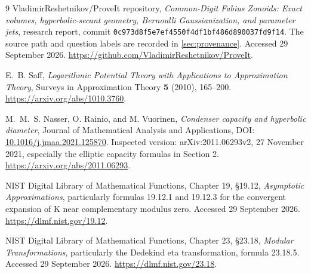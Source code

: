 \documentclass[11pt,a4paper]{article}
\theoremstyle{definition}
\theoremstyle{remark}
\newcommand{\K}{\mathrm K}
\begin{document}
\begin{thebibliography}{9}
VladimirReshetnikov/ProveIt repository,
\emph{Common-Digit Fabius Zonoids: Exact volumes, hyperbolic-secant geometry,
Bernoulli Gaussianization, and parameter jets}, research report,
commit \texttt{0c973d8f5e7ef4550f4df1bf486d890037fd9f14}.
The source path and question labels are recorded in
\cref{sec:provenance}. Accessed 29 September 2026.
\url{https://github.com/VladimirReshetnikov/ProveIt}.

E.~B. Saff,
\emph{Logarithmic Potential Theory with Applications to Approximation Theory},
Surveys in Approximation Theory \textbf{5} (2010), 165--200.
\url{https://arxiv.org/abs/1010.3760}.

M.~M.~S. Nasser, O. Rainio, and M. Vuorinen,
\emph{Condenser capacity and hyperbolic diameter},
Journal of Mathematical Analysis and Applications,
DOI: \href{https://doi.org/10.1016/j.jmaa.2021.125870}{10.1016/j.jmaa.2021.125870}.
Inspected version: arXiv:2011.06293v2, 27 November 2021,
especially the elliptic capacity formulas in Section 2.
\url{https://arxiv.org/abs/2011.06293}.

NIST Digital Library of Mathematical Functions,
Chapter 19, \S19.12, \emph{Asymptotic Approximations},
particularly formulas 19.12.1 and 19.12.3 for the convergent expansion of
$\K$ near complementary modulus zero. Accessed 29 September 2026.
\url{https://dlmf.nist.gov/19.12}.

NIST Digital Library of Mathematical Functions,
Chapter 23, \S23.18, \emph{Modular Transformations},
particularly the Dedekind eta transformation, formula 23.18.5.
Accessed 29 September 2026.
\url{https://dlmf.nist.gov/23.18}.
\end{thebibliography}
\end{document}
